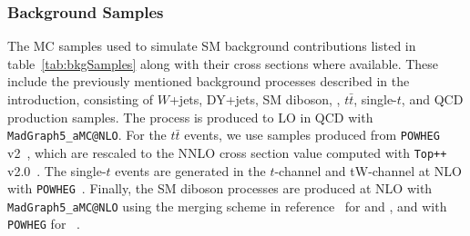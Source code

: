 %  

%  

%  

\subsubsection{Background Samples}

The MC samples used to simulate SM background contributions listed in table~\ref{tab:bkgSamples} along with their cross sections where available. %
These include the previously mentioned background processes described in the introduction, consisting of $W$+jets, DY+jets, SM diboson, \bbbar, $t\bar{t}$, single-$t$, and QCD production samples.
The \Wjets process is produced to LO in QCD with \texttt{MadGraph5\_aMC@NLO}.
For the $t\bar{t}$ events, we use samples produced from \texttt{POWHEG} v2~\cite{Nason_2004,Frixione_2007,Alioli_2010,Alioli_2012}, which are rescaled to the NNLO cross section value computed with \texttt{Top++} v2.0~\cite{Czakon_2014}.
The single-$t$ events are generated in the $t$-channel and tW-channel at NLO with \texttt{POWHEG}~\cite{Alioli_2009,Re_2011}.
Finally, the SM diboson processes are produced at NLO with \texttt{MadGraph5\_aMC@NLO} using the merging scheme in reference~\cite{Frederix_2012} for \WZ and \ZZ, and with \texttt{POWHEG} for \WW~\cite{Nason_2014}.

